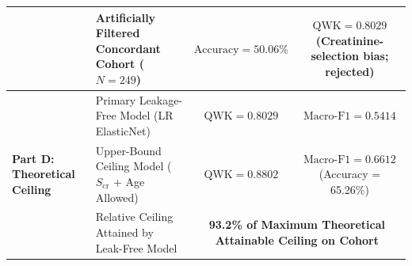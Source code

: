 \documentclass{IEEEtran}
\begin{document}
\begin{table}[t]
\begin{tabularx}{\textwidth}{lXcc}
& Artificially Filtered Concordant Cohort ($N = 249$) & $\text{Accuracy} = 50.06\%$ & $\text{QWK} = 0.8029$ (Creatinine-selection bias; rejected) \\
\midrule
\multirow{3}{*}{\textbf{Part D: Theoretical Ceiling}} 
& Primary Leakage-Free Model (LR ElasticNet) & $\text{QWK} = 0.8029$ & $\text{Macro-F1} = 0.5414$ \\
& Upper-Bound Ceiling Model ($S_{\text{cr}}$ + Age Allowed) & $\text{QWK} = \mathbf{0.8802}$ & $\text{Macro-F1} = \mathbf{0.6612}$ (Accuracy = 65.26\%) \\
& Relative Ceiling Attained by Leak-Free Model & \multicolumn{2}{c}{\textbf{93.2\% of Maximum Theoretical Attainable Ceiling on Cohort}} \\
\bottomrule
\end{tabularx}
\end{table}
\end{document}
